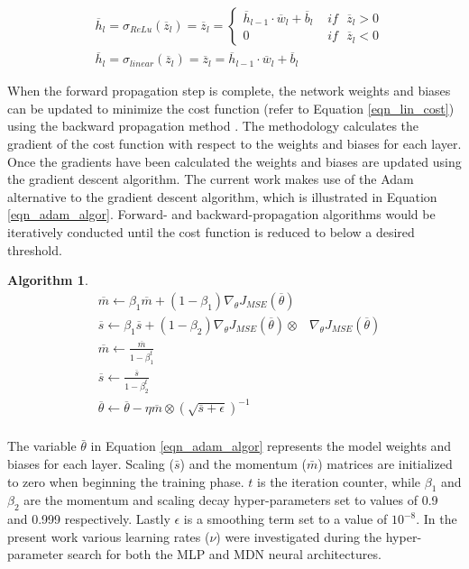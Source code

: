 \documentclass[a4paper,fleqn]{cas-sc}
\newtheorem{theorem}{Algorithm}
\begin{document}
\begin{equation}\label{eqn_act_func}
\begin{split}
&\overline{h}_l=\sigma_{ReLu}(\overline{z}_l) = \overline{z}_l =  
	\begin{cases}
	 \overline{h}_{l-1}\cdot\overline{w}_l+\overline{b}_l\,\, &if\,\,\,\, \overline{z}_l>0\\
	 0\,\, &if\,\,\,\, \overline{z}_l<0
	\end{cases}\\
&\overline{h}_l=\sigma_{linear}(\overline{z}_l) = \overline{z}_l = \overline{h}_{l-1}\cdot\overline{w}_l+\overline{b}_l
\end{split}
\end{equation}

When the forward propagation step is complete, the network weights and biases can be updated to minimize the cost function (refer to Equation \ref{eqn_lin_cost}) using the backward propagation method \cite{Rumelhart1986}. The methodology calculates the gradient of the cost function with respect to the weights and biases for each layer. Once the gradients have been calculated the weights and biases are updated using the gradient descent algorithm. The current work makes use of the Adam \cite{goodfellow} alternative to the gradient descent algorithm, which is illustrated in Equation \ref{eqn_adam_algor}. Forward- and backward-propagation algorithms would be iteratively conducted until the cost function is reduced to below a desired threshold.
\begin{theorem} 
\begin{equation}\label{eqn_adam_algor} 
\begin{split}
&\overline{m}\leftarrow \beta_1\overline{m}+(1-\beta_1)\nabla_{\theta}J_{MSE}(\overline{\theta})\\
&\overline{s}\leftarrow \beta_1\overline{s}+(1-\beta_2)\nabla_{\theta}J_{MSE}(\overline{\theta})\otimes&\nabla_{\theta}J_{MSE}(\overline{\theta})\\
&\overline{m}\leftarrow\frac{\overline{m}}{1-\beta_1^t} \\
&\overline{s}\leftarrow\frac{\overline{s}}{1-\beta_2^t}\\
&\overline{\theta}\leftarrow\overline{\theta}-\eta\overline{m}\otimes(\sqrt{\overline{s}+\epsilon})^{-1}\\
\end{split}
\end{equation}
\end{theorem}

The variable $\bar{\theta}$ in Equation \ref{eqn_adam_algor} represents the model weights and biases for each layer. Scaling ($\bar{s}$) and the momentum ($\bar{m}$) matrices are initialized to zero when beginning the training phase. $t$ is the iteration counter, while $\beta_1$ and $\beta_2$ are the momentum and scaling decay hyper-parameters set to values of 0.9 and 0.999 respectively. Lastly $\epsilon$ is a smoothing term set to a value of $10^{-8}$. In the present work various learning rates ($\nu$) were investigated during the hyper-parameter search for both the MLP and MDN neural architectures.
\end{document}

